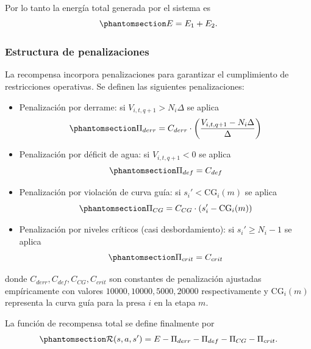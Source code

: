 \documentclass[
  letterpaper,
  DIV=11,
  numbers=noendperiod]{scrreprt}
\theoremstyle{definition}
\theoremstyle{remark}
\begin{document}
Por lo tanto la energía total generada por el sistema es
\begin{equation}\protect\phantomsection\label{eq-energia-total}{E = E_1+E_2.}\end{equation}

\subsubsection{Estructura de
penalizaciones}\label{estructura-de-penalizaciones}

La recompensa incorpora penalizaciones para garantizar el cumplimiento
de restricciones operativas. Se definen las siguientes penalizaciones:

\begin{itemize}
\item
  Penalización por derrame: si \(V_{i,t,q+1} > N_i \Delta\) se aplica
  \begin{equation}\protect\phantomsection\label{eq-penalizacion-derrame}{\Pi_{derr} = C_{derr}\cdot\left(\frac{V_{i,t,q+1}-N_i \Delta}{\Delta}\right)}\end{equation}
\item
  Penalización por déficit de agua: si \(V_{i,t,q+1} < 0\) se aplica
  \begin{equation}\protect\phantomsection\label{eq-penalizacion-deficit}{\Pi_{def} = C_{def}}\end{equation}
\item
  Penalización por violación de curva guía: si \(s_i' < \text{CG}_i(m)\)
  se aplica
  \begin{equation}\protect\phantomsection\label{eq-penalizacion-curva-guia}{\Pi_{CG} = C_{CG}\cdot(s_i'- \text{CG}_i(m))}\end{equation}
\item
  Penalización por niveles críticos (casi desbordamiento): si
  \(s_i' \geq N_i-1\) se aplica
  \begin{equation}\protect\phantomsection\label{eq-penalizacion-niveles-criticos}{\Pi_{crit} = C_{crit}}\end{equation}
\end{itemize}

donde \(C_{derr}, C_{def}, C_{CG}, C_{crit}\) son constantes de
penalización ajustadas empíricamente con valores
\(10000, 10000, 5000, 20000\) respectivamente y \(\text{CG}_i(m)\)
representa la curva guía para la presa \(i\) en la etapa \(m\).

La función de recompensa total se define finalmente por
\begin{equation}\protect\phantomsection\label{eq-recompensa}{\mathcal{R}(s,a,s') = E - \Pi_{derr} - \Pi_{def} - \Pi_{CG} - \Pi_{crit}.}\end{equation}
\end{document}
